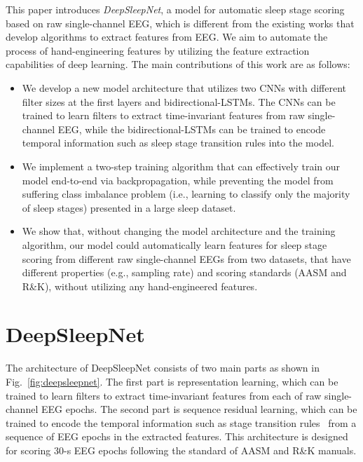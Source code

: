 \documentclass[journal,twoside]{IEEEtran}
\begin{document}
This paper introduces \textit{DeepSleepNet}, a model for automatic sleep stage scoring based on raw single-channel EEG, which is different from the existing works that develop algorithms to extract features from EEG. We aim to automate the process of hand-engineering features by utilizing the feature extraction capabilities of deep learning. The main contributions of this work are as follows:
\begin{itemize}
  \item We develop a new model architecture that utilizes two CNNs with different filter sizes at the first layers and bidirectional-LSTMs. The CNNs can be trained to learn filters to extract time-invariant features from raw single-channel EEG, while the bidirectional-LSTMs can be trained to encode temporal information such as sleep stage transition rules into the model.
  \item We implement a two-step training algorithm that can effectively train our model end-to-end via backpropagation, while preventing the model from suffering class imbalance problem (i.e., learning to classify only the majority of sleep stages) presented in a large sleep dataset.
\item We show that, without changing the model architecture and the training algorithm, our model could automatically learn features for sleep stage scoring from different raw single-channel EEGs from two datasets, that have different properties (e.g., sampling rate) and scoring standards (AASM and R\&K), without utilizing any hand-engineered features.
\end{itemize}



\IEEEpubidadjcol

















\section{DeepSleepNet} \label{sec:deepsleepnet}
The architecture of DeepSleepNet consists of two main parts as shown in Fig.~\ref{fig:deepsleepnet}.
The first part is representation learning, which can be trained to learn filters to extract time-invariant features from each of raw single-channel EEG epochs. The second part is sequence residual learning, which can be trained to encode the temporal information such as stage transition rules~\cite{iber2007} from a sequence of EEG epochs in the extracted features. This architecture is designed for scoring 30-s EEG epochs following the standard of AASM and R\&K manuals.
\end{document}
